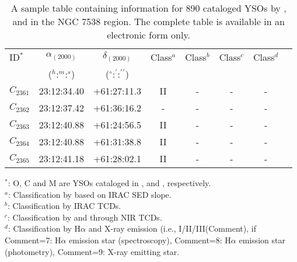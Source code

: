 \documentclass[a4paper,fleqn,usenatbib,useAMS]{mnras}
\begin{document}
\begin{table}
\caption{\label{data1_yso}  A sample table containing information for 890 cataloged YSOs by  
 \citet{2004ApJ...616.1042O}, \citet{2014MNRAS.439.3719C} and  \citet{2014MNRAS.443.3218M} in the NGC 7538 region. 
The complete table is available in an electronic form only. }
\begin{tabular}{@{}lccc@{}c@{}c@{}c@{}c@{}}
\hline
ID$^*$& $\alpha_{(2000)}$  & $\delta_{(2000)}$  & Class$^a$   & Class$^b$ & Class$^c$ & Class$^d$\\
&  ($^h$:$^m$:$^s$)  & ($^\circ$:$^\prime$:$^\prime$$^\prime$) & &                &              &                \\
\hline
$C_{2361}$ & 23:12:34.40 &+61:27:11.3 & II&      -  &      - &   -  \\
$C_{2362}$ & 23:12:37.42 &+61:36:16.2 & -&      -   &      - &   -  \\
$C_{2363}$ & 23:12:40.88 &+61:24:56.5 & II&     -   &      - &   -  \\
$C_{2364}$ & 23:12:40.88 &+61:31:38.8 & II&      -  &      - &   -  \\
$C_{2365}$ & 23:12:41.18 &+61:28:02.1 & II&      -  &      - &   -  \\
\hline
\end{tabular}
$^*$: O, C and M are YSOs cataloged in  \citet{2004ApJ...616.1042O}, \citet{2014MNRAS.439.3719C} and  \citet{2014MNRAS.443.3218M}, respectively.\\
$^a$: Classification by \citet{2014MNRAS.439.3719C} based on IRAC SED slope.\\
$^b$: Classification by IRAC TCDs.\\  
$^c$: Classification by \citet{2004ApJ...616.1042O} and \citet{2014MNRAS.443.3218M} through NIR TCDs.\\
$^d$: Classification by H$\alpha$ and X-ray emission (i.e., I/II/III(Comment), if Comment=7: H$\alpha$ emission star (spectroscopy), Comment=8: H$\alpha$ emission star (photometry), Comment=9: X-ray emitting star.\\

\end{table}
\end{document}
